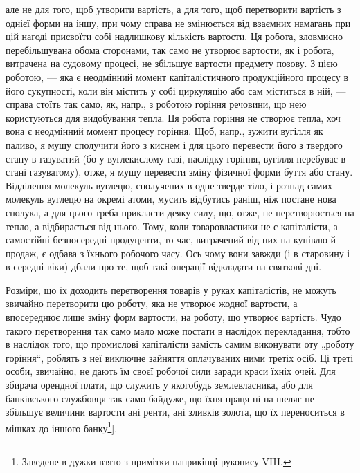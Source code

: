 \parcont{}  %
але не для того, щоб утворити вартість, а для того, щоб перетворити
вартість з однієї форми на іншу, при чому справа не змінюється від
взаємних намагань при цій нагоді присвоїти собі надлишкову кількість
вартости. Ця робота, зловмисно перебільшувана обома сторонами, так само не
утворює вартости, як і робота, витрачена на судовому процесі, не
збільшує вартости предмету позову. З цією роботою, — яка є неодмінний
момент капіталістичного продукційного процесу в його сукупності, коли
він містить у собі циркуляцію або сам міститься в ній, — справа стоїть
так само, як, напр., з роботою горіння речовини, що нею користуються для
видобування тепла. Ця робота горіння не створює тепла, хоч вона є
неодмінний момент процесу горіння. Щоб, напр., зужити вугілля як
паливо, я мушу сполучити його з киснем і для цього перевести його з
твердого стану в газуватий (бо у вуглекислому газі, наслідку горіння,
вугілля перебуває в стані газуватому), отже, я мушу перевести зміну
фізичної форми буття або стану. Відділення молекуль вуглецю, сполучених
в одне тверде тіло, і розпад самих молекуль вуглецю на окремі атоми,
мусить відбутись раніш, ніж постане нова сполука, а для цього треба
прикласти деяку силу, що, отже, не перетворюється на тепло, а
відбирається від нього. Тому, коли товаровласники не є капіталісти, а
самостійні безпосередні продуценти, то час, витрачений від них на купівлю
й продаж, є одбава з їхнього робочого часу. Ось чому вони завжди
(і в старовину і в середні віки) дбали про те, щоб такі операції відкладати
на святкові дні.

Розміри, що їх доходить перетворення товарів у руках капіталістів, не
можуть звичайно перетворити цю роботу, яка не утворює жодної вартости,
а впосереднює лише зміну форм вартости, на роботу, що утворює вартість.
Чудо такого перетворення так само мало може постати в наслідок
перекладання, тобто в наслідок того, що промислові капіталісти замість
самим виконувати оту „роботу горіння“, роблять з неї виключне зайняття
оплачуваних ними третіх осіб. Ці треті особи, звичайно, не дають їм
своєї робочої сили заради краси їхніх очей. Для збирача орендної плати,
що служить у якогобудь землевласника, або для банківського службовця
так само байдуже, що їхня праця ні на шеляг не збільшує величини
вартости ані ренти, ані зливків золота, що їх переноситься в мішках до
іншого банку\footnote{
Заведене в дужки взято з примітки наприкінці рукопису VIII.
}].
\label{original-86}

